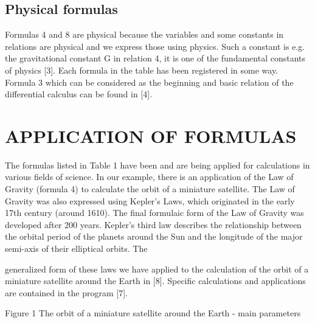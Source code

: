 \documentclass[conference]{IEEEtran}
\begin{document}
\subsection{Physical formulas}

Formulas 4 and 8 are physical because the variables and some constants in relations are physical
and we express those using physics. Such a constant is e.g. the gravitational constant G in relation 4, it
is one of the fundamental constants of physics [3]. Each formula in the table has been registered in
some way. Formula 3 which can be considered as the beginning and basic relation of the differential
calculus can be found in [4].

\section{APPLICATION OF FORMULAS}

The formulas listed in Table 1 have been and are being applied for calculations in various fields of
science. In our example, there is an application of the Law of Gravity (formula 4) to calculate the orbit
of a miniature satellite. The Law of Gravity was also expressed using Kepler's Laws, which originated
in the early 17th century (around 1610). The final formulaic form of the Law of Gravity was
developed after 200 years. Kepler's third law describes the relationship between the orbital period of
the planets around the Sun and the longitude of the major semi-axis of their elliptical orbits. The

generalized form of these laws we have applied to the calculation of the orbit of a miniature satellite
around the Earth in [8]. Specific calculations and applications are contained in the program [7].

Figure 1 The orbit of a miniature satellite around the Earth - main parameters
\end{document}
